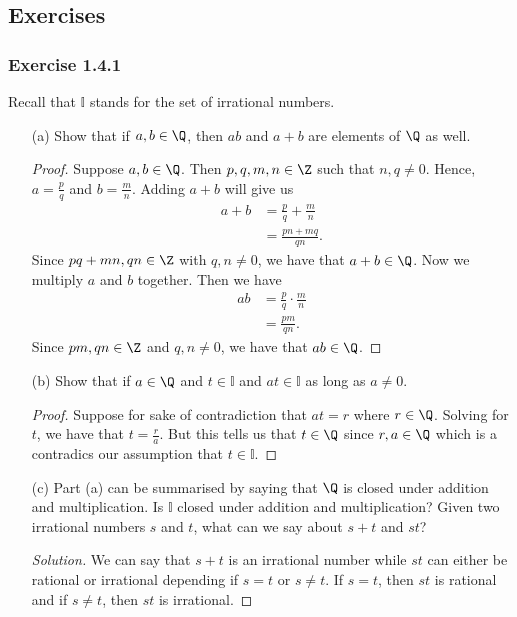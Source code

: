 \subsection{Exercises}

\subsubsection{Exercise 1.4.1} Recall that \( \mathbb{I}\) stands for the set of irrational numbers. 

\begin{enumerate}
    \item[(a)] Show that if \( a,b \in \Q \), then \( ab \) and \( a + b \) are elements of \( \Q \) as well. 
        
    
    \begin{proof}
        Suppose \( a,b \in \Q \). Then \( p,q,m,n \in \Z \) such that \( n, q \neq 0 \). Hence, \( a = \frac{p}{q} \) and \( b = \frac{m}{n}\). Adding \( a + b \) will give us 
        \begin{align*}
            a + b &= \frac{p}{q} + \frac{m}{n} \\ 
                  &= \frac{pn + mq}{qn}. 
        \end{align*}
        Since \( pq + mn, qn \in \Z \) with \( q,n \neq 0 \), we have that \( a + b \in \Q \). Now we multiply \( a \) and \( b \) together. Then we have 
        \begin{align*}
            ab &= \frac{p}{q} \cdot \frac{m}{n} \\ 
               &= \frac{pm}{qn}.
        \end{align*}
        Since \( pm, qn \in \Z \) and \( q,n \neq 0 \), we have that \( ab \in \Q \).
    \end{proof}

    \item[(b)] Show that if \( a \in \Q  \) and \( t \in \mathbb{I} \) and \( at \in \mathbb{I} \) as long as \( a \neq 0 \). 
    \begin{proof}
       Suppose for sake of contradiction that \( at = r \) where \( r \in \Q \). Solving for \( t \), we have that \( t = \frac{r}{a} \). But this tells us that \( t \in \Q \) since \( r, a \in \Q \) which is a contradics our assumption that \( t \in \mathbb{I} \).
    
    \end{proof}
     
    \item[(c)] Part (a) can be summarised by saying that \( \Q \) is closed under addition and multiplication. Is \( \mathbb{I} \) closed under addition and multiplication? Given two irrational numbers \( s \) and \( t \), what can we say about \( s + t \) and \( st\)?
        
    
    \begin{proof}[Solution]
        We can say that \( s + t \) is an irrational number while \( st \) can either be rational or irrational depending if \( s = t \) or \( s \neq t \). If \( s = t \), then \( st \) is rational and if \( s \neq t \), then \( st \) is irrational. 
    \end{proof}
    
\end{enumerate}


